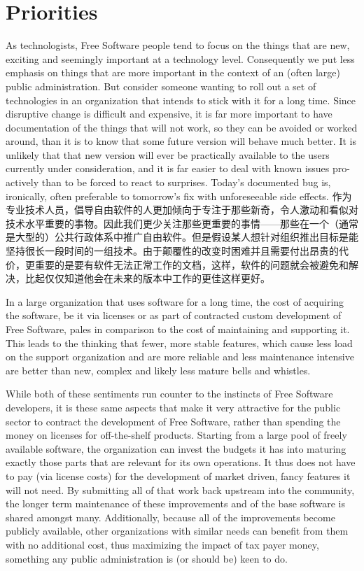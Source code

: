 \section*{Priorities}

As technologists, Free Software people tend to focus on the things that are
new, exciting and seemingly important at a technology level. Consequently we
put less emphasis on things that are more important in the context of an (often
large) public administration. But consider someone wanting to roll out a
set of technologies in an organization that intends to stick with it for a long
time. Since disruptive change is difficult and expensive, it is far more
important to have documentation of the things that will not work, so they can
be avoided or worked around, than it is to know that some future version will
behave much better. It is unlikely that that new version will ever be
practically available to the users currently under consideration, and it is far
easier to deal with known issues pro-actively than to be forced to react to
surprises.  Today's documented bug is, ironically, often preferable to
tomorrow's fix with unforeseeable side effects.
作为专业技术人员，倡导自由软件的人更加倾向于专注于那些新奇，令人激动和看似对技术水平重要的事物。因此我们更少关注那些更重要的事情——那些在一个（通常是大型的）公共行政体系中推广自由软件。但是假设某人想针对组织推出目标是能坚持很长一段时间的一组技术。由于颠覆性的改变时困难并且需要付出昂贵的代价，更重要的是要有软件无法正常工作的文档，这样，软件的问题就会被避免和解决，比起仅仅知道他会在未来的版本中工作的更佳这样更好。

In a large organization that uses software for a long time, the cost of acquiring
the software, be it via licenses or as part of contracted custom development of
Free Software, pales in comparison to the cost of maintaining and supporting it.
This leads to the thinking that fewer, more stable features, which cause less load
on the support organization and are more reliable and less maintenance intensive
are better than new, complex and likely less mature bells and whistles.

While both of these sentiments run counter to the instincts of Free Software
developers, it is these same aspects that make it very attractive for the
public sector to contract the development of Free Software, rather than
spending the money on licenses for off-the-shelf products. Starting from a
large pool of freely available software, the organization can invest the
budgets it has into maturing exactly those parts that are relevant for its own
operations. It thus does not have to pay (via license costs) for the development of
market driven, fancy features it will not need. By submitting all of that work
back upstream into the community, the longer term maintenance of these
improvements and of the base software is shared amongst many. Additionally,
because all of the improvements become publicly available, other
organizations with similar needs can benefit from them with no
additional cost, thus maximizing the impact of tax payer money,
something any public administration is (or should be) keen to do.

